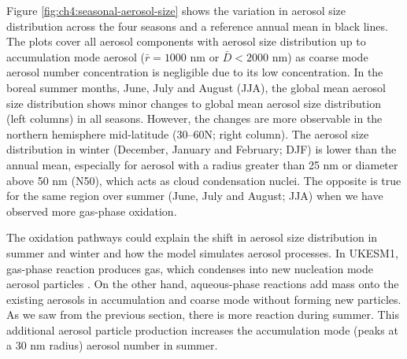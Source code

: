 Figure \ref{fig:ch4:seasonal-aerosol-size} shows the variation in aerosol size distribution across the four seasons and a reference annual mean in black lines. The plots cover all aerosol components with aerosol size distribution up to accumulation mode aerosol ($\bar{r} = 1000$ \unit{\nano\metre} or $\bar{D} < 2000$ \unit{\nano\metre}) as coarse mode aerosol number concentration is negligible due to its low concentration. In the boreal summer months, June, July and August (JJA), the global mean aerosol size distribution shows minor changes to global mean aerosol size distribution (left columns) in all seasons. However, the changes are more observable in the northern hemisphere mid-latitude (30\textdegree--60\textdegree N; right column). The aerosol size distribution in winter (December, January and February; DJF) is lower than the annual mean, especially for aerosol with a radius greater than 25 \unit{\nano\metre} or diameter above 50 \unit{\nano\metre} (N50), which acts as cloud condensation nuclei. The opposite is true for the same region over summer (June, July and August; JJA) when we have observed more gas-phase oxidation.


The  oxidation pathways could explain the shift in aerosol size distribution in summer and winter and how the model simulates aerosol processes. In UKESM1,  gas-phase reaction produces  gas, which condenses into new nucleation mode aerosol particles \citep{mannDescriptionEvaluationGLOMAPmode2010}. On the other hand,  aqueous-phase reactions add  mass onto the existing aerosols in accumulation and coarse mode without forming new particles. As we saw from the previous section, there is more  reaction during summer. This additional aerosol particle production increases the accumulation mode (peaks at a 30 nm radius) aerosol number in summer. 



